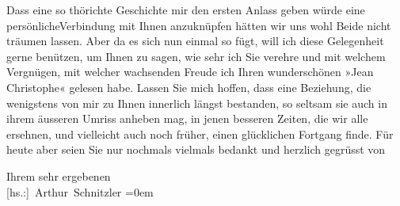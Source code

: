 \pstart
           Dass eine so t\introOben{}h\introOben{}örichte Geschichte mir den ersten Anlass geben würde eine persönlich\introOben{}e\introOben{}{ }{\pb}Verbindung mit Ihnen anzuknüpfen hätten wir uns wohl Beide nicht träumen lassen. Aber
               da es sich nun einmal so fügt, will ich diese Gelegenheit gerne benützen, um Ihnen zu
               sagen, wie sehr ich Sie verehre und mit welchem Vergnügen, mit welcher wachsenden
               Freude ich Ihren wunderschönen »Jean Christophe« gelesen
               habe. Lassen Sie mich hoffen, dass eine Beziehung, die wenigstens von mir zu Ihnen
               innerlich längst bestanden, so seltsam sie auch in ihrem äusseren Umriss anheben mag,
               in jenen besseren Zeiten, die wir alle ersehnen\introOben{},\introOben{} und vielleicht auch noch früher,
               einen glücklichen Fortgang finde. Für heute aber seien Sie nur nochmals vielmals
               bedankt und herzlich gegrüsst von\pend
           
\pstart
           Ihrem sehr ergebenen{\\[\baselineskip]}\spacefill\mbox{{[}hs.:{]} Arthur Schnitzler}\pend
           \leftskip=0em{}\endnumbering{}
\begin{anhang}
\end{anhang}\newcommand{\dateiname}{L03884}\newcommand{\titel}{Arthur Schnitzler an Romain Rolland, 14. 12. 1914}\newcommand{\editorInnen}{Selma Jahnke und Martin Anton Müller}
